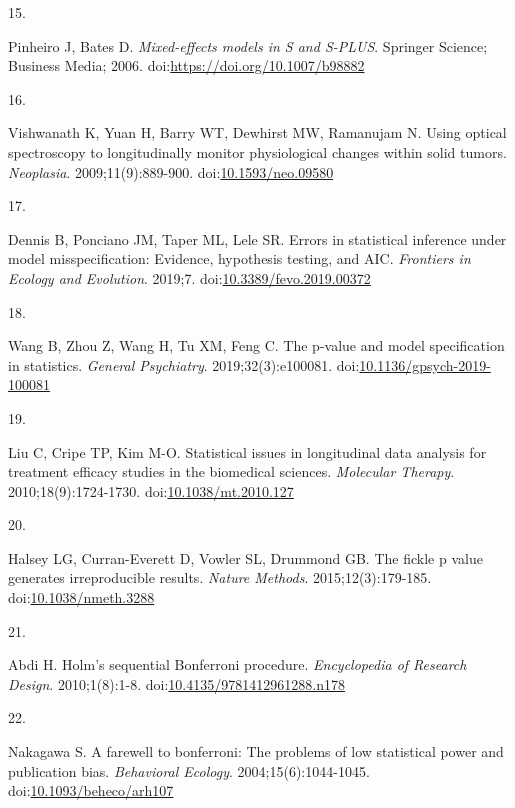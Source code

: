 \documentclass[
]{article}
\newlength{\cslhangindent}
\newlength{\csllabelwidth}
\newlength{\cslentryspacingunit} %
\newenvironment{CSLReferences}[2] %
 {%
  \setlength{\parindent}{0pt}
  \ifodd #1
  \let\oldpar\par
  \def\par{\hangindent=\cslhangindent\oldpar}
  \fi
  \setlength{\parskip}{#2\cslentryspacingunit}
 }%
 {}
\newcommand{\CSLLeftMargin}[1]{\parbox[t]{\csllabelwidth}{#1}}
\newcommand{\CSLRightInline}[1]{\parbox[t]{\linewidth - \csllabelwidth}{#1}\break}
\begin{document}
\begin{CSLReferences}{0}{0}
\leavevmode{}%
\CSLLeftMargin{15. }
\CSLRightInline{Pinheiro J, Bates D. \emph{{Mixed-effects models in S and S-PLUS}}. Springer Science; Business Media; 2006. doi:\url{https://doi.org/10.1007/b98882}}

\leavevmode{}%
\CSLLeftMargin{16. }
\CSLRightInline{Vishwanath K, Yuan H, Barry WT, Dewhirst MW, Ramanujam N. Using optical spectroscopy to longitudinally monitor physiological changes within solid tumors. \emph{Neoplasia}. 2009;11(9):889-900. doi:\href{https://doi.org/10.1593/neo.09580}{10.1593/neo.09580}}

\leavevmode{}%
\CSLLeftMargin{17. }
\CSLRightInline{Dennis B, Ponciano JM, Taper ML, Lele SR. Errors in statistical inference under model misspecification: Evidence, hypothesis testing, and {AIC}. \emph{Frontiers in Ecology and Evolution}. 2019;7. doi:\href{https://doi.org/10.3389/fevo.2019.00372}{10.3389/fevo.2019.00372}}

\leavevmode{}%
\CSLLeftMargin{18. }
\CSLRightInline{Wang B, Zhou Z, Wang H, Tu XM, Feng C. The p-value and model specification in statistics. \emph{General Psychiatry}. 2019;32(3):e100081. doi:\href{https://doi.org/10.1136/gpsych-2019-100081}{10.1136/gpsych-2019-100081}}

\leavevmode{}%
\CSLLeftMargin{19. }
\CSLRightInline{Liu C, Cripe TP, Kim M-O. Statistical issues in longitudinal data analysis for treatment efficacy studies in the biomedical sciences. \emph{Molecular Therapy}. 2010;18(9):1724-1730. doi:\href{https://doi.org/10.1038/mt.2010.127}{10.1038/mt.2010.127}}

\leavevmode{}%
\CSLLeftMargin{20. }
\CSLRightInline{Halsey LG, Curran-Everett D, Vowler SL, Drummond GB. The fickle p value generates irreproducible results. \emph{Nature Methods}. 2015;12(3):179-185. doi:\href{https://doi.org/10.1038/nmeth.3288}{10.1038/nmeth.3288}}

\leavevmode{}%
\CSLLeftMargin{21. }
\CSLRightInline{Abdi H. {Holm's sequential Bonferroni procedure}. \emph{Encyclopedia of Research Design}. 2010;1(8):1-8. doi:\href{https://doi.org/10.4135/9781412961288.n178}{10.4135/9781412961288.n178}}

\leavevmode{}%
\CSLLeftMargin{22. }
\CSLRightInline{Nakagawa S. A farewell to bonferroni: The problems of low statistical power and publication bias. \emph{Behavioral Ecology}. 2004;15(6):1044-1045. doi:\href{https://doi.org/10.1093/beheco/arh107}{10.1093/beheco/arh107}}


\end{CSLReferences}
\end{document}
